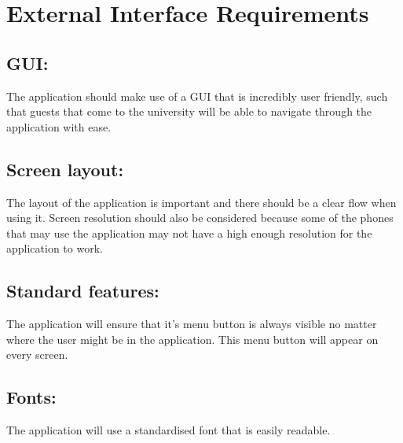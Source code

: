 \documentclass[11pt]{article}
\begin{document}
\section{External Interface Requirements}
\subsection{GUI:}
	The application should make use of a GUI that is incredibly user friendly, such that guests that come to the university will be 	able to navigate through the application with ease.
\subsection{Screen layout:}
	The layout of the application is important and there should be a clear flow when using it. Screen resolution should also be 		considered because some of the phones that may use the application may not have a high enough resolution for the application to 	work.
\subsection{Standard features:}
	The application will ensure that it's menu button is always visible no matter where the user might be in the application. This 		menu button will appear on every screen.
\subsection{Fonts:}
	The application will use a standardised font that is easily readable.
\end{document}
